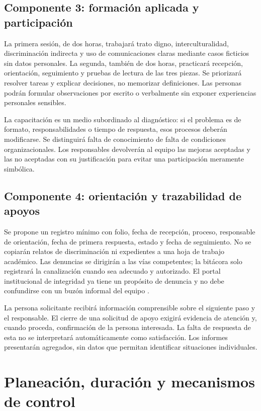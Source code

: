 \documentclass[12pt,letterpaper,oneside]{article}
\begin{document}
\subsection{Componente 3: formación aplicada y participación}
La primera sesión, de dos horas, trabajará trato digno, interculturalidad, discriminación indirecta y uso de comunicaciones claras mediante casos ficticios sin datos personales. La segunda, también de dos horas, practicará recepción, orientación, seguimiento y pruebas de lectura de las tres piezas. Se priorizará resolver tareas y explicar decisiones, no memorizar definiciones. Las personas podrán formular observaciones por escrito o verbalmente sin exponer experiencias personales sensibles.

La capacitación es un medio subordinado al diagnóstico: si el problema es de formato, responsabilidades o tiempo de respuesta, esos procesos deberán modificarse. Se distinguirá falta de conocimiento de falta de condiciones organizacionales. Los responsables devolverán al equipo las mejoras aceptadas y las no aceptadas con su justificación para evitar una participación meramente simbólica.

\subsection{Componente 4: orientación y trazabilidad de apoyos}
Se propone un registro mínimo con folio, fecha de recepción, proceso, responsable de orientación, fecha de primera respuesta, estado y fecha de seguimiento. No se copiarán relatos de discriminación ni expedientes a una hoja de trabajo académico. Las denuncias se dirigirán a las vías competentes; la bitácora solo registrará la canalización cuando sea adecuado y autorizado. El portal institucional de integridad ya tiene un propósito de denuncia y no debe confundirse con un buzón informal del equipo \parencite{fga10integridad}.

La persona solicitante recibirá información comprensible sobre el siguiente paso y el responsable. El cierre de una solicitud de apoyo exigirá evidencia de atención y, cuando proceda, confirmación de la persona interesada. La falta de respuesta de esta no se interpretará automáticamente como satisfacción. Los informes presentarán agregados, sin datos que permitan identificar situaciones individuales.

\section{Planeación, duración y mecanismos de control}
\end{document}
